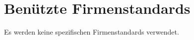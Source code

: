 \chapter{Benützte Firmenstandards}\label{ch:benuetzte-firmenstandards}
Es werden keine spezifischen Firmenstandards verwendet.
